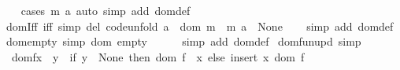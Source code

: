 \begin{isabellebody}
%
\isadelimproof
\ \ %
\endisadelimproof
%
\isatagproof
{}\isamarkupfalse%
\ {\isacharparenleft}{\kern0pt}cases\ {\isachardoublequoteopen}m\ a{\isachardoublequoteclose}{\isacharparenright}{\kern0pt}\ {\isacharparenleft}{\kern0pt}auto\ simp\ add{\isacharcolon}{\kern0pt}\ dom{\isacharunderscore}{\kern0pt}def{\isacharparenright}{\kern0pt}%
\endisatagproof
{\isafoldproof}%
%
\isadelimproof
\isanewline
%
\endisadelimproof
\isanewline
{}\isamarkupfalse%
\ domIff\ {\isacharbrackleft}{\kern0pt}iff{\isacharcomma}{\kern0pt}\ simp\ del{\isacharcomma}{\kern0pt}\ code{\isacharunderscore}{\kern0pt}unfold{\isacharbrackright}{\kern0pt}{\isacharcolon}{\kern0pt}\ {\isachardoublequoteopen}a\ {\isasymin}\ dom\ m\ {\isasymlongleftrightarrow}\ m\ a\ {\isasymnoteq}\ None{\isachardoublequoteclose}\isanewline
%
\isadelimproof
\ \ %
\endisadelimproof
%
\isatagproof
{}\isamarkupfalse%
\ {\isacharparenleft}{\kern0pt}simp\ add{\isacharcolon}{\kern0pt}\ dom{\isacharunderscore}{\kern0pt}def{\isacharparenright}{\kern0pt}%
\endisatagproof
{\isafoldproof}%
%
\isadelimproof
\isanewline
%
\endisadelimproof
\isanewline
{}\isamarkupfalse%
\ dom{\isacharunderscore}{\kern0pt}empty\ {\isacharbrackleft}{\kern0pt}simp{\isacharbrackright}{\kern0pt}{\isacharcolon}{\kern0pt}\ {\isachardoublequoteopen}dom\ empty\ {\isacharequal}{\kern0pt}\ {\isacharbraceleft}{\kern0pt}{\isacharbraceright}{\kern0pt}{\isachardoublequoteclose}\isanewline
%
\isadelimproof
\ \ %
\endisadelimproof
%
\isatagproof
{}\isamarkupfalse%
\ {\isacharparenleft}{\kern0pt}simp\ add{\isacharcolon}{\kern0pt}\ dom{\isacharunderscore}{\kern0pt}def{\isacharparenright}{\kern0pt}%
\endisatagproof
{\isafoldproof}%
%
\isadelimproof
\isanewline
%
\endisadelimproof
\isanewline
{}\isamarkupfalse%
\ dom{\isacharunderscore}{\kern0pt}fun{\isacharunderscore}{\kern0pt}upd\ {\isacharbrackleft}{\kern0pt}simp{\isacharbrackright}{\kern0pt}{\isacharcolon}{\kern0pt}\isanewline
\ \ {\isachardoublequoteopen}dom{\isacharparenleft}{\kern0pt}f{\isacharparenleft}{\kern0pt}x\ {\isacharcolon}{\kern0pt}{\isacharequal}{\kern0pt}\ y{\isacharparenright}{\kern0pt}{\isacharparenright}{\kern0pt}\ {\isacharequal}{\kern0pt}\ {\isacharparenleft}{\kern0pt}if\ y\ {\isacharequal}{\kern0pt}\ None\ then\ dom\ f\ {\isacharminus}{\kern0pt}\ {\isacharbraceleft}{\kern0pt}x{\isacharbraceright}{\kern0pt}\ else\ insert\ x\ {\isacharparenleft}{\kern0pt}dom\ f{\isacharparenright}{\kern0pt}{\isacharparenright}{\kern0pt}{\isachardoublequoteclose}\isanewline
%
\isadelimproof
\ \ %
\endisadelimproof
%
\isatagproof

\end{isabellebody}
